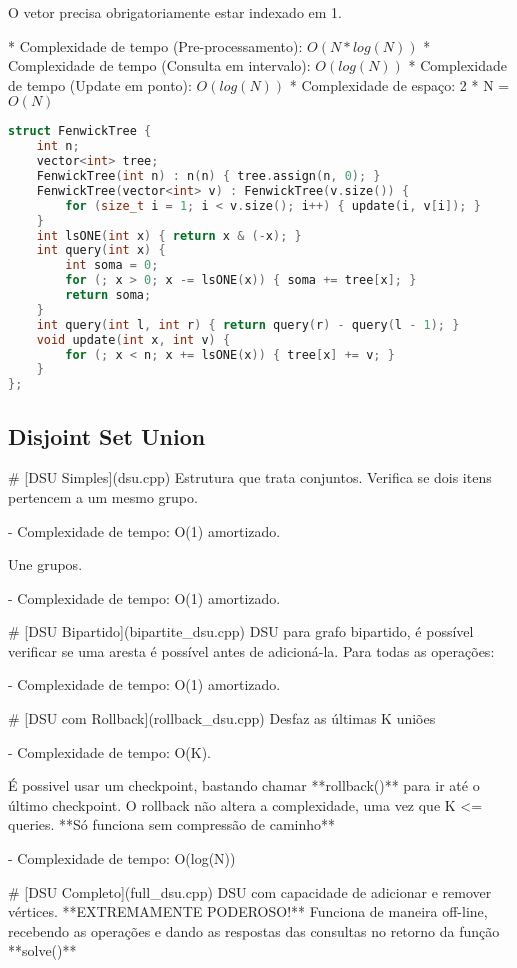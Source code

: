 \documentclass[11pt, a4paper, twoside]{article}
\begin{document}
O vetor precisa obrigatoriamente estar indexado em 1.

* Complexidade de tempo (Pre-processamento): $O(N * log(N))$
* Complexidade de tempo (Consulta em intervalo): $O(log(N))$
* Complexidade de tempo (Update em ponto): $O(log(N))$
* Complexidade de espaço: 2 * N = $O(N)$

\begin{lstlisting}[language=C++]
struct FenwickTree {
    int n;
    vector<int> tree;
    FenwickTree(int n) : n(n) { tree.assign(n, 0); }
    FenwickTree(vector<int> v) : FenwickTree(v.size()) {
        for (size_t i = 1; i < v.size(); i++) { update(i, v[i]); }
    }
    int lsONE(int x) { return x & (-x); }
    int query(int x) {
        int soma = 0;
        for (; x > 0; x -= lsONE(x)) { soma += tree[x]; }
        return soma;
    }
    int query(int l, int r) { return query(r) - query(l - 1); }
    void update(int x, int v) {
        for (; x < n; x += lsONE(x)) { tree[x] += v; }
    }
};
\end{lstlisting}

\subsection{Disjoint Set Union}



\# [DSU Simples](dsu.cpp)
Estrutura que trata conjuntos.  
Verifica se dois itens pertencem a um mesmo grupo.

- Complexidade de tempo: O(1) amortizado.

Une grupos.

- Complexidade de tempo: O(1) amortizado.

\# [DSU Bipartido](bipartite\_dsu.cpp)
DSU para grafo bipartido, é possível verificar se uma aresta é possível antes de adicioná-la.  
Para todas as operações:

- Complexidade de tempo: O(1) amortizado.

\# [DSU com Rollback](rollback\_dsu.cpp)
Desfaz as últimas K uniões

- Complexidade de tempo: O(K).

É possivel usar um checkpoint, bastando chamar **rollback()** para ir até o último checkpoint.  
O rollback não altera a complexidade, uma vez que K <= queries.  
**Só funciona sem compressão de caminho**

- Complexidade de tempo: O(log(N))

\# [DSU Completo](full\_dsu.cpp)
DSU com capacidade de adicionar e remover vértices.  
**EXTREMAMENTE PODEROSO!**  
Funciona de maneira off-line, recebendo as operações e dando as respostas das consultas no retorno da função **solve()**
\end{document}
